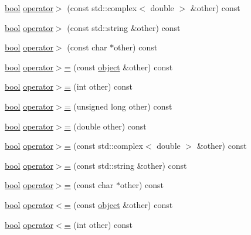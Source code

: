 \begin{DoxyCompactItemize}
\item 
\hyperlink{compiler_8h_abb452686968e48b67397da5f97445f5b}{bool} \hyperlink{classpy_1_1object_aa4faa6b64f75e2a20385a0b4354d2bea}{operator$>$} (const std\+::complex$<$ double $>$ \&other) const 
\item 
\hyperlink{compiler_8h_abb452686968e48b67397da5f97445f5b}{bool} \hyperlink{classpy_1_1object_a35dbeb4ea15e74f4c798409a5f1aacf5}{operator$>$} (const std\+::string \&other) const 
\item 
\hyperlink{compiler_8h_abb452686968e48b67397da5f97445f5b}{bool} \hyperlink{classpy_1_1object_a491536cb2e2a1f1779802d27acb68d21}{operator$>$} (const char $\ast$other) const 
\item 
\hyperlink{compiler_8h_abb452686968e48b67397da5f97445f5b}{bool} \hyperlink{classpy_1_1object_a112d888f1dbe7b7e667277e91f83b5c4}{operator$>$=} (const \hyperlink{classpy_1_1object}{object} \&other) const 
\item 
\hyperlink{compiler_8h_abb452686968e48b67397da5f97445f5b}{bool} \hyperlink{classpy_1_1object_aaf01132811846f8ed8653703a54ac40b}{operator$>$=} (int other) const 
\item 
\hyperlink{compiler_8h_abb452686968e48b67397da5f97445f5b}{bool} \hyperlink{classpy_1_1object_ab19955f281da5b9d28a1c47544903790}{operator$>$=} (unsigned long other) const 
\item 
\hyperlink{compiler_8h_abb452686968e48b67397da5f97445f5b}{bool} \hyperlink{classpy_1_1object_a5e775e7d0587cb1c9deba198380bbbe2}{operator$>$=} (double other) const 
\item 
\hyperlink{compiler_8h_abb452686968e48b67397da5f97445f5b}{bool} \hyperlink{classpy_1_1object_addaf7170b9be73d86d4368d5f919998b}{operator$>$=} (const std\+::complex$<$ double $>$ \&other) const 
\item 
\hyperlink{compiler_8h_abb452686968e48b67397da5f97445f5b}{bool} \hyperlink{classpy_1_1object_a3de9606984091b3ebb15d438544145b3}{operator$>$=} (const std\+::string \&other) const 
\item 
\hyperlink{compiler_8h_abb452686968e48b67397da5f97445f5b}{bool} \hyperlink{classpy_1_1object_a37f5338196af07604309471865198630}{operator$>$=} (const char $\ast$other) const 
\item 
\hyperlink{compiler_8h_abb452686968e48b67397da5f97445f5b}{bool} \hyperlink{classpy_1_1object_a374aa4b7f173974106c6d666944795a7}{operator$<$=} (const \hyperlink{classpy_1_1object}{object} \&other) const 
\item 
\hyperlink{compiler_8h_abb452686968e48b67397da5f97445f5b}{bool} \hyperlink{classpy_1_1object_aae19b4b6caf6dd48ffde5ca045cc6341}{operator$<$=} (int other) const 

\end{DoxyCompactItemize}
